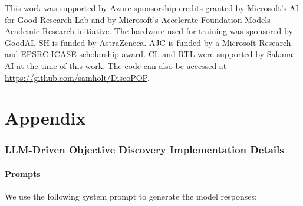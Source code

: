 \documentclass{article}
\theoremstyle{plain}
\theoremstyle{definition}
\theoremstyle{remark}
\begin{document}
\acksection
This work was supported by Azure sponsorship credits granted by Microsoft’s AI for Good Research Lab and by Microsoft's Accelerate Foundation Models Academic Research initiative. The hardware used for training was sponsored by GoodAI. SH is funded by AstraZeneca. AJC is funded by a Microsoft Research and EPSRC ICASE scholarship award. CL and RTL were supported by Sakana AI at the time of this work. The code can also be accessed at \url{https://github.com/samholt/DiscoPOP}.





\newpage
\appendix

\part{Appendix}
\parttoc

\vfill

\vfill

\clearpage


\section{LLM-Driven Objective Discovery Implementation Details}
\label{LLMDrivenObjectiveMetaDiscoveryImplementationDetails}

\subsection{Prompts}
\label{subsec:prompts}

We use the following system prompt to generate the model responses:
\end{document}
